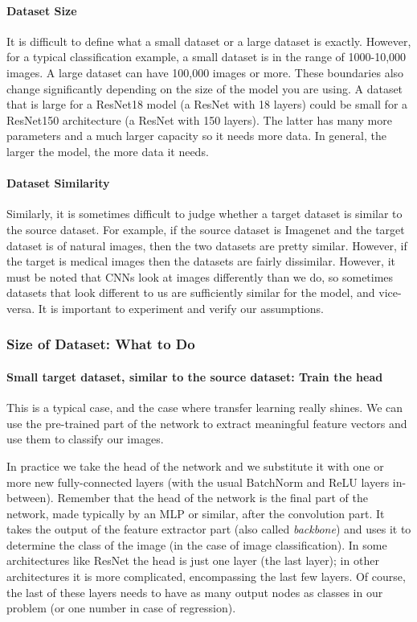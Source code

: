 \paragraph{Dataset Size}

It is difficult to define what a small dataset or a large dataset is exactly. However, for a typical classification example, a small dataset is in the range of 1000-10,000 images. A large dataset can have 100,000 images or more. These boundaries also change significantly depending on the size of the model you are using. A dataset that is large for a ResNet18 model (a ResNet with 18 layers) could be small for a ResNet150 architecture (a ResNet with 150 layers). The latter has many more parameters and a much larger capacity so it needs more data. In general, the larger the model, the more data it needs.

\paragraph{Dataset Similarity}

Similarly, it is sometimes difficult to judge whether a target dataset is similar to the source dataset. For example, if the source dataset is Imagenet and the target dataset is of natural images, then the two datasets are pretty similar. However, if the target is medical images then the datasets are fairly dissimilar. However, it must be noted that CNNs look at images differently than we do, so sometimes datasets that look different to us are sufficiently similar for the model, and vice-versa. It is important to experiment and verify our assumptions.

\subsubsection{Size of Dataset: What to Do}

\paragraph{Small target dataset, similar to the source dataset: Train the head}

This is a typical case, and the case where transfer learning really shines. We can use the pre-trained part of the network to extract meaningful feature vectors and use them to classify our images.\newline

In practice we take the head of the network and we substitute it with one or more new fully-connected layers (with the usual BatchNorm and ReLU layers in-between). Remember that the head of the network is the final part of the network, made typically by an MLP or similar, after the convolution part. It takes the output of the feature extractor part (also called \textit{backbone}) and uses it to determine the class of the image (in the case of image classification). In some architectures like ResNet the head is just one layer (the last layer); in other architectures it is more complicated, encompassing the last few layers. Of course, the last of these layers needs to have as many output nodes as classes in our problem (or one number in case of regression).

